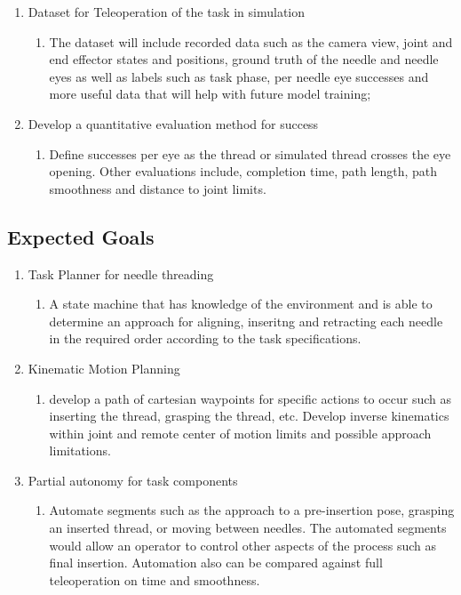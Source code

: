 \documentclass[conference]{IEEEtran}
\begin{document}
\begin{enumerate}
    \item Dataset for Teleoperation of the task in simulation
    \begin{enumerate}
        \item The dataset will include recorded data such as the camera view, joint and end effector states and positions, ground truth of the needle and needle eyes as well as labels such as task phase, per needle eye successes and more useful data that will help with future model training;
    \end{enumerate}
    
    \item Develop a quantitative evaluation method for success
    \begin{enumerate}
        \item Define successes per eye as the thread or simulated thread crosses the eye opening. Other evaluations include, completion time, path length, path smoothness and distance to joint limits.
    \end{enumerate}
    
\end{enumerate}

\subsection{Expected Goals}
\begin{enumerate}
    \item Task Planner for needle threading
    \begin{enumerate}
        \item A state machine that has knowledge of the environment and is able to determine an approach for aligning, inseritng and retracting each needle in the required order according to the task specifications.
    \end{enumerate}
    
    \item Kinematic Motion Planning
    \begin{enumerate}
        \item develop a path of cartesian waypoints for specific actions to occur such as inserting the thread, grasping the thread, etc. Develop inverse kinematics within joint and remote center of motion limits and possible approach limitations. 
    \end{enumerate}
    
    \item Partial autonomy for task components
    \begin{enumerate}
        \item Automate segments such as the approach to a pre-insertion pose, grasping an inserted thread, or moving between needles. The automated segments would allow an operator to control other aspects of the process such as final insertion. Automation also can be compared against full teleoperation on time and smoothness.
    \end{enumerate}    
\end{enumerate}
\end{document}

